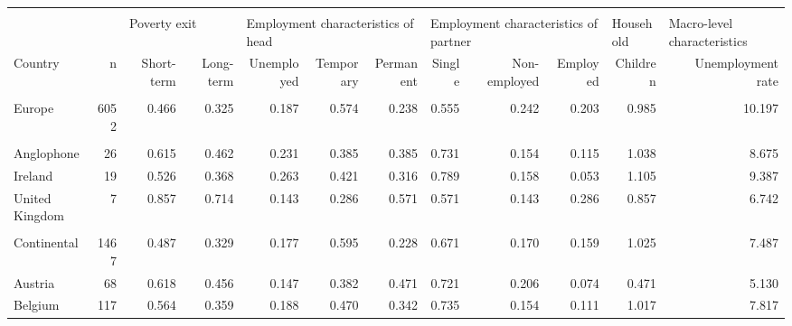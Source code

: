 \begin{tabular}{lrrrrrrrrrrr}
   \\[-1.8ex]\hline\hline \\ 
 [-1.8ex] &  & \multicolumn{2}{l}{Poverty exit} & 
                          \multicolumn{3}{l}{Employment characteristics of head} & 
                          \multicolumn{3}{l}{Employment characteristics of partner} & 
                          \multicolumn{1}{l}{Household} &
                          \multicolumn{1}{l}{Macro-level characteristics} \\ 
 
            \cmidrule(lr){3-4} 
            \cmidrule(lr){5-7}
            \cmidrule(lr){8-10}
            \cmidrule(lr){11-11}
            \cmidrule(lr){12-12}
              Country & 
                         n & 
                         Short-term & Long-term & 
                         Unemployed & 
                         Temporary & 
                         Permanent & 
                         Single & Non-employed & Employed & Children &
                         Unemployment rate \\ 
 \hline
\\[-1.8ex]
\hspace{5mm} Europe & 6052 & 0.466 & 0.325 & 0.187 & 0.574 & 0.238 & 0.555 & 0.242 & 0.203 & 0.985 & 10.197 \\ 
  \multicolumn{10}{l}{\phantom{empty}} \\
        \hspace{5mm} Anglophone &   26 & 0.615 & 0.462 & 0.231 & 0.385 & 0.385 & 0.731 & 0.154 & 0.115 & 1.038 & 8.675 \\ 
  \hspace{10mm} Ireland &   19 & 0.526 & 0.368 & 0.263 & 0.421 & 0.316 & 0.789 & 0.158 & 0.053 & 1.105 & 9.387 \\ 
  \hspace{10mm} United Kingdom &    7 & 0.857 & 0.714 & 0.143 & 0.286 & 0.571 & 0.571 & 0.143 & 0.286 & 0.857 & 6.742 \\ 
  \multicolumn{10}{l}{\phantom{empty}} \\
        \hspace{5mm} Continental & 1467 & 0.487 & 0.329 & 0.177 & 0.595 & 0.228 & 0.671 & 0.170 & 0.159 & 1.025 & 7.487 \\ 
  \hspace{10mm} Austria &   68 & 0.618 & 0.456 & 0.147 & 0.382 & 0.471 & 0.721 & 0.206 & 0.074 & 0.471 & 5.130 \\ 
  \hspace{10mm} Belgium &  117 & 0.564 & 0.359 & 0.188 & 0.470 & 0.342 & 0.735 & 0.154 & 0.111 & 1.017 & 7.817 \\ 

\end{tabular}
